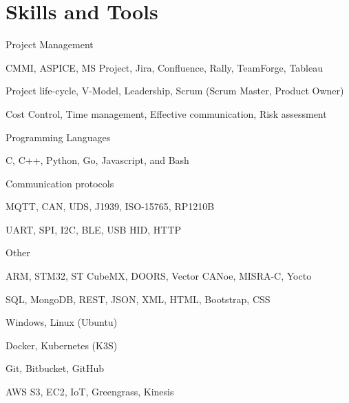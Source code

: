 \documentclass{resume} %
\begin{document}

\section{Skills and Tools}


\skillgroup
    {Project Management}
    {
    \begin{itemize-bullets}
        \item{CMMI, ASPICE, MS Project, Jira, Confluence, Rally, TeamForge, Tableau}
        \item{Project life-cycle, V-Model, Leadership, Scrum (Scrum Master, Product Owner)}
        \item{Cost Control, Time management, Effective communication, Risk assessment}
        \end{itemize-bullets}
    }


\skillgroup
    {Programming Languages}
    {
    \begin{itemize-bullets}
        \item{C, C++, Python, Go, Javascript, and Bash}
        \end{itemize-bullets}
    }


\skillgroup
    {Communication protocols}
    {
    \begin{itemize-bullets}
        \item{MQTT, CAN, UDS, J1939, ISO-15765, RP1210B}
        \item{UART, SPI, I2C, BLE, USB HID, HTTP}
        \end{itemize-bullets}
    }


\skillgroup
    {Other}
    {
    \begin{itemize-bullets}
        \item{ARM, STM32, ST CubeMX, DOORS, Vector CANoe, MISRA-C, Yocto}
        \item{SQL, MongoDB, REST, JSON, XML, HTML, Bootstrap, CSS}
        \item{Windows, Linux (Ubuntu)}
        \item{Docker, Kubernetes (K3S)}
        \item{Git, Bitbucket, GitHub}
        \item{AWS S3, EC2, IoT, Greengrass, Kinesis}
        \end{itemize-bullets}
    }


\end{document}
